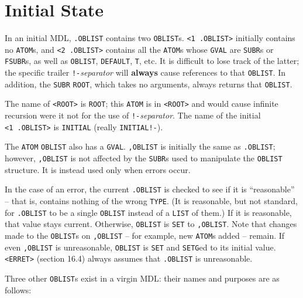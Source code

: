 \documentclass[a4paper]{scrbook}
\begin{document}
\section{Initial State}\label{initial-state}

In an initial MDL, \texttt{.OBLIST} contains two \texttt{OBLIST}s.
\texttt{\textless{}1\ .OBLIST\textgreater{}} initially contains no \texttt{ATOM}s, and
\texttt{\textless{}2\ .OBLIST\textgreater{}} contains all the \texttt{ATOM}s whose \texttt{GVAL} are \texttt{SUBR}s or
\texttt{FSUBR}s, as well as \texttt{OBLIST}, \texttt{DEFAULT}, \texttt{T}, etc. It is
difficult to lose track of the latter; the specific trailer \texttt{!-}\emph{separator} will \textbf{always} cause
references to that \texttt{OBLIST}. In addition, the \texttt{SUBR} \texttt{ROOT}, which takes
no arguments, always returns that \texttt{OBLIST}.

The name of \texttt{\textless{}ROOT\textgreater{}} is \texttt{ROOT}; this \texttt{ATOM} is in
\texttt{\textless{}ROOT\textgreater{}} and would cause infinite recursion were it not for the use of
\texttt{!-}\emph{separator}. The name of the initial \texttt{\textless{}1\ .OBLIST\textgreater{}} is
\texttt{INITIAL} (really \texttt{INITIAL!-}).

The \texttt{ATOM} \texttt{OBLIST} also has a \texttt{GVAL}. \texttt{,OBLIST} is initially the same as \texttt{.OBLIST};
however, \texttt{,OBLIST} is not affected by the \texttt{SUBR}s used to manipulate the \texttt{OBLIST} structure. It is
instead used only when errors occur.

In the case of an error, the current \texttt{.OBLIST} is checked to see if it is ``reasonable'' -- that is, contains
nothing of the wrong \texttt{TYPE}. (It is reasonable, but not standard, for \texttt{.OBLIST} to be a single
\texttt{OBLIST} instead of a \texttt{LIST} of them.) If it is reasonable, that value stays current. Otherwise,
\texttt{OBLIST} is \texttt{SET} to \texttt{,OBLIST}. Note that changes made to the \texttt{OBLIST}s on \texttt{,OBLIST} --
for example, new \texttt{ATOM}s added -- remain. If even \texttt{,OBLIST} is unreasonable, \texttt{OBLIST} is \texttt{SET}
and \texttt{SETG}ed to its initial value. \texttt{\textless{}ERRET\textgreater{}} (section 16.4) always assumes that
\texttt{.OBLIST} is unreasonable.

Three other \texttt{OBLIST}s exist in a virgin MDL: their names and purposes are as follows:
\end{document}
